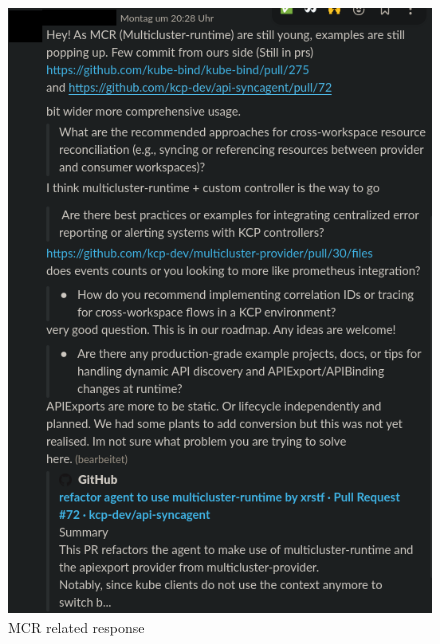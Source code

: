 \documentclass[11pt, a4paper, oneside, listof=totoc]{scrartcl}
\begin{document}
                \begin{figure}[h!]
                    \centering
                    \includegraphics[width=\textwidth]{screenshots/slack/mcr-answer.anonymized.png}
                    \caption{MCR related response}\label{fig:mcr-response}
                \end{figure}

            \FloatBarrier
\end{document}
